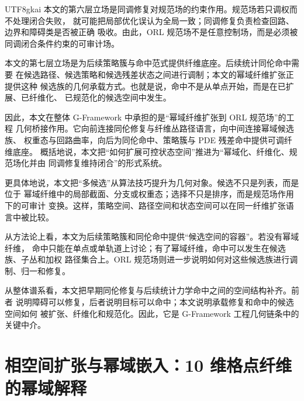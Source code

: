 \documentclass[12pt]{article}
\newcommand{\GFramework}{\textsf{G-Framework}}
\begin{document}
\begin{CJK*}{UTF8}{gkai}
本文的第六层立场是同调修复对规范场的约束作用。规范场若只调权而不处理闭合失败，
就可能把局部优化误认为全局一致；同调修复负责检查回路、边界和障碍类是否被正确
吸收。由此，ORL 规范场不是任意控制场，而是必须被同调闭合条件约束的可审计场。

本文的第七层立场是为后续策略簇与命中范式提供纤维底座。后续统计同伦命中需要
在候选路径、候选策略和候选残差状态之间进行调制；本文的幂域纤维扩张正提供这种
候选族的几何承载方式。也就是说，命中不是从单点开始，而是在已扩展、已纤维化、
已规范化的候选空间中发生。

因此，本文在整体 \GFramework{} 中承担的是“幂域纤维扩张到 ORL 规范场”的工程
几何桥接作用。它向前连接同伦修复与纤维丛路径语言，向中间连接幂域候选族、
权重态与回路曲率，向后为同伦命中、策略簇与 PDE 残差命中提供可调纤维底座。
概括地说，本文把“如何扩展可控状态空间”推进为“幂域化、纤维化、规范场化并由
同调修复维持闭合”的形式系统。

更具体地说，本文把“多候选”从算法技巧提升为几何对象。候选不只是列表，而是位于
幂域纤维中的局部截面、分支或权重态；选择不只是排序，而是规范场作用下的可审计
变换。这样，策略空间、路径空间和状态空间可以在同一纤维扩张语言中被比较。

从方法论上看，本文为后续策略簇和同伦命中提供“候选空间的容器”。若没有幂域纤维，
命中只能在单点或单轨道上讨论；有了幂域纤维，命中可以发生在候选族、子丛和加权
路径集合上。ORL 规范场则进一步说明如何对这些候选族进行调制、归一和修复。

从整体谱系看，本文把早期同伦修复与后续统计力学命中之间的空间结构补齐。前者
说明障碍可以修复，后者说明目标可以命中；本文说明承载修复和命中的候选空间如何
被扩张、纤维化和规范化。因此，它是 \GFramework{} 工程几何链条中的关键中介。

\setcounter{tocdepth}{3}
\setcounter{secnumdepth}{3}
\tableofcontents
\clearpage

\section{相空间扩张与幂域嵌入：10 维格点纤维的幂域解释}
\label{sec:tex27-ch1-powerdomain}


\end{CJK*}
\end{document}
